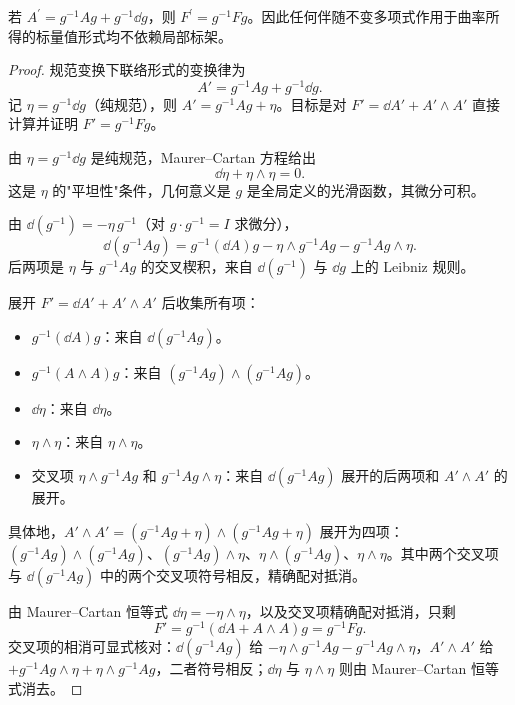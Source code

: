 \begin{proposition}[曲率的齐次规范变换]
若 $A^\prime=g^{-1}Ag+g^{-1}\dd g$，则 $F^\prime=g^{-1}Fg$。因此任何伴随不变多项式作用于曲率所得的标量值形式均不依赖局部标架。
\end{proposition}
\begin{proof}
规范变换下联络形式的变换律为
\begin{equation*}
 A'=g^{-1}Ag+g^{-1}\dd g.
\end{equation*}
记 $\eta=g^{-1}\dd g$（纯规范），则 $A'=g^{-1}Ag+\eta$。目标是对 $F'=\dd A'+A'\wedge A'$ 直接计算并证明 $F'=g^{-1}Fg$。

由 $\eta=g^{-1}\dd g$ 是纯规范，Maurer--Cartan 方程给出
\begin{equation*}
 \dd\eta+\eta\wedge\eta=0.
\end{equation*}
这是 $\eta$ 的"平坦性"条件，几何意义是 $g$ 是全局定义的光滑函数，其微分可积。

由 $\dd(g^{-1})=-\eta\,g^{-1}$（对 $g\cdot g^{-1}=I$ 求微分），
\begin{equation*}
 \dd(g^{-1}Ag)
 =g^{-1}(\dd A)g
 -\eta\wedge g^{-1}Ag
 -g^{-1}Ag\wedge\eta.
\end{equation*}
后两项是 $\eta$ 与 $g^{-1}Ag$ 的交叉楔积，来自 $\dd(g^{-1})$ 与 $\dd g$ 上的 Leibniz 规则。

展开 $F'=\dd A'+A'\wedge A'$ 后收集所有项：
\begin{itemize}
\item $g^{-1}(\dd A)g$：来自 $\dd(g^{-1}Ag)$。
\item $g^{-1}(A\wedge A)g$：来自 $(g^{-1}Ag)\wedge(g^{-1}Ag)$。
\item $\dd\eta$：来自 $\dd\eta$。
\item $\eta\wedge\eta$：来自 $\eta\wedge\eta$。
\item 交叉项 $\eta\wedge g^{-1}Ag$ 和 $g^{-1}Ag\wedge\eta$：来自 $\dd(g^{-1}Ag)$ 展开的后两项和 $A'\wedge A'$ 的展开。
\end{itemize}
具体地，$A'\wedge A'=(g^{-1}Ag+\eta)\wedge(g^{-1}Ag+\eta)$ 展开为四项：$(g^{-1}Ag)\wedge(g^{-1}Ag)$、$(g^{-1}Ag)\wedge\eta$、$\eta\wedge(g^{-1}Ag)$、$\eta\wedge\eta$。其中两个交叉项与 $\dd(g^{-1}Ag)$ 中的两个交叉项符号相反，精确配对抵消。

由 Maurer--Cartan 恒等式 $\dd\eta=-\eta\wedge\eta$，以及交叉项精确配对抵消，只剩
\begin{equation*}
 F'=g^{-1}(\dd A+A\wedge A)g
 =g^{-1}Fg.
\end{equation*}
交叉项的相消可显式核对：$\dd(g^{-1}Ag)$ 给 $-\eta\wedge g^{-1}Ag-g^{-1}Ag\wedge\eta$，$A'\wedge A'$ 给 $+g^{-1}Ag\wedge\eta+\eta\wedge g^{-1}Ag$，二者符号相反；$\dd\eta$ 与 $\eta\wedge\eta$ 则由 Maurer--Cartan 恒等式消去。


\end{proof}
